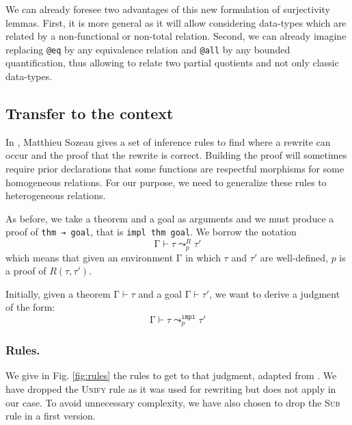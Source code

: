 \documentclass{llncs}
\begin{document}
We can already foresee two advantages of this new formulation of
surjectivity lemmas. First, it is more general as it will allow
considering data-types which are related by a non-functional or
non-total relation.
Second, we can already imagine replacing \verb|@eq| by any equivalence
relation and \verb|@all| by any bounded quantification, thus allowing
to relate two partial quotients and not only classic data-types.

\subsection{Transfer to the context}

In \cite{Sozeau2010}, Matthieu Sozeau
gives a set of inference rules to find where a rewrite can
occur and the proof that the rewrite is correct. Building the
proof will sometimes require prior declarations that
some functions are respectful morphisms for
some homogeneous relations.
For our purpose, we need to generalize these rules to
heterogeneous relations.

As before, we take a theorem and a goal
as arguments and we must produce a proof of \texttt{thm → goal}, that is
\texttt{impl thm goal}.
We borrow the notation
\[
    \mathrm{\Gamma} \vdash \tau \leadsto^R_p \tau'
\]
which means that given an environment $\mathrm{\Gamma}$
in which $\tau$ and $\tau'$ are well-defined,
$p$ is a proof of $R(\tau, \tau')$.

Initially, given a theorem $\mathrm{\Gamma} \vdash \tau$ and a goal
$\mathrm{\Gamma} \vdash \tau'$, we want to derive a judgment of the form:
\[
    \mathrm{\Gamma} \vdash \tau \leadsto^{\mathtt{impl}}_p \tau'
\]

\subsubsection{Rules.}

We give in Fig. \ref{fig:rules}
the rules to get to that judgment, adapted from \cite{Sozeau2010}. We have dropped
the \textsc{Unify} rule as it was used for rewriting but does not
apply in our case. To avoid unnecessary complexity,
we have also chosen to drop the \textsc{Sub} rule in a first version.
\end{document}
